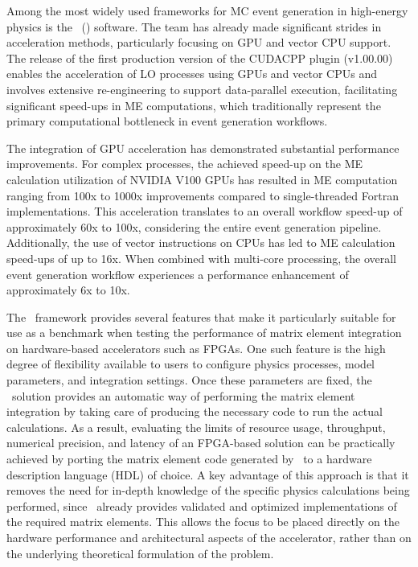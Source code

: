 Among the most widely used frameworks for MC event generation in high-energy physics is the \amcnlo~(\mgfive) software. The team has already made significant strides in acceleration methods, particularly focusing on GPU and vector CPU support. The release of the first production version of the CUDACPP plugin (v1.00.00) ~\cite{Valassi:2025xfn} enables the acceleration of LO processes using GPUs and vector CPUs and involves extensive re-engineering to support data-parallel execution, facilitating significant speed-ups in ME computations, which traditionally represent the primary computational bottleneck in event generation workflows. 

The integration of GPU acceleration has demonstrated substantial performance improvements. For complex processes, the achieved speed-up on the ME calculation utilization of NVIDIA V100 GPUs has resulted in ME computation ranging from 100x to 1000x improvements compared to single-threaded Fortran implementations. This acceleration translates to an overall workflow speed-up of approximately 60x to 100x, considering the entire event generation pipeline. Additionally, the use of vector instructions on CPUs has led to ME calculation speed-ups of up to 16x. When combined with multi-core processing, the overall event generation workflow experiences a performance enhancement of approximately 6x to 10x.

The \mgfive~framework provides several features that make it particularly suitable for use as a benchmark when testing the performance of matrix element integration on hardware-based accelerators such as FPGAs. One such feature is the high degree of flexibility available to users to configure physics processes, model parameters, and integration settings. Once these parameters are fixed, the \mgfive~solution provides an automatic way of performing the matrix element integration by taking care of producing the necessary code to run the actual calculations. As a result, evaluating the limits of resource usage, throughput, numerical precision, and latency of an FPGA-based solution can be practically achieved by porting the matrix element code generated by \mgfive~to a hardware description language (HDL) of choice. A key advantage of this approach is that it removes the need for in-depth knowledge of the specific physics calculations being performed, since \mgfive~already provides validated and optimized implementations of the required matrix elements. This allows the focus to be placed directly on the hardware performance and architectural aspects of the accelerator, rather than on the underlying theoretical formulation of the problem.

